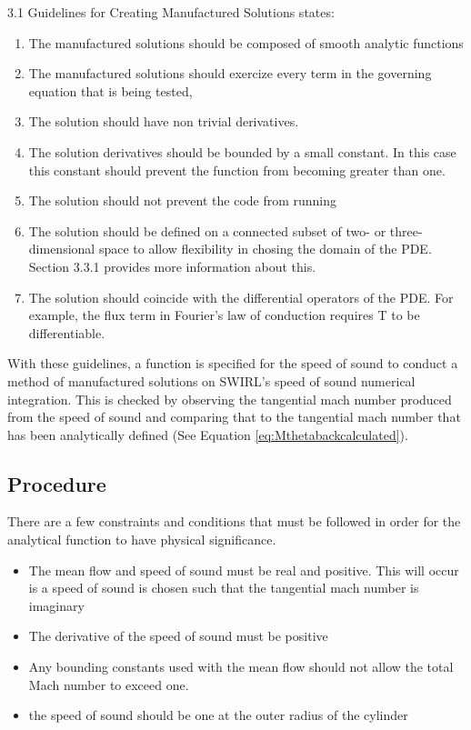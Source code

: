 \documentclass[12pt]{article}
\begin{document}
3.1 Guidelines for Creating Manufactured Solutions states:
\begin{enumerate}
    \item  The manufactured solutions should be composed of smooth analytic 
        functions 
    \item The manufactured solutions should exercize every term in the governing
        equation that is being tested,
    \item The solution should have non trivial derivatives.  
    \item The solution derivatives should be bounded by a small constant. In this case
        this constant should prevent the function from becoming greater than 
        one.
    \item The solution should not prevent the code from running 
    \item The solution should be defined on a connected subset of two- or three-
        dimensional space to allow flexibility in chosing the domain of the PDE.
        Section 3.3.1 provides more information about this.
    \item The solution should coincide with the differential operators of the PDE.
        For example, the flux term in Fourier's law of conduction requires T to 
        be differentiable.
\end{enumerate}
With these guidelines, a function is specified for the speed of sound to conduct
a method of manufactured solutions on SWIRL's speed of sound numerical 
integration. This is checked by observing the tangential mach number 
produced from the speed of sound and comparing that to the tangential mach number
that has been analytically defined (See Equation \ref{eq:Mthetabackcalculated}).
\subsection{Procedure}

There are a few constraints and conditions that must be followed in order for the analytical 
function to have physical significance.
\begin{itemize}
    \item The mean flow and speed of sound must be real and positive. This will 
        occur is a speed of sound is chosen such that the tangential mach number
        is imaginary
    \item The derivative of the speed of sound must be positive
    \item Any bounding constants used with the mean flow should not allow the 
        total Mach number to exceed one.
    \item the speed of sound should be one at the outer radius of the cylinder
\end{itemize}
\end{document}

